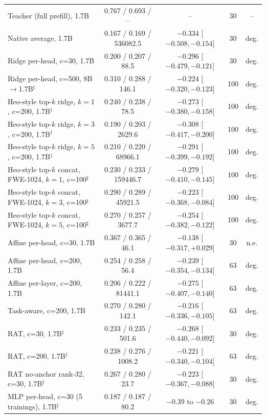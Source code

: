 \documentclass[10pt]{article}
\begin{document}
\begin{table}[t]
\begin{tabular}{lcccc}
Teacher (full prefill), 1.7B & 0.767 / 0.693 / -- & -- & 30 & -- \\
Native average, 1.7B & 0.167 / 0.169 / 536082.5 & $-0.334$ [$-0.508, -0.154$] & 30 & deg. \\
Ridge per-head, c=30, 1.7B & 0.200 / 0.207 / 88.5 & $-0.296$ [$-0.479, -0.121$] & 30 & deg. \\
Ridge per-head, c=500, 8B$\to$1.7B$^\ddagger$ & 0.310 / 0.288 / 146.1 & $-0.224$ [$-0.320, -0.123$] & 100 & deg. \\
Heo-style top-$k$ ridge, $k{=}1$, c=200, 1.7B$^\ddagger$ & 0.240 / 0.238 / 78.5 & $-0.273$ [$-0.380, -0.158$] & 100 & deg. \\
Heo-style top-$k$ ridge, $k{=}3$, c=200, 1.7B$^\ddagger$ & 0.190 / 0.203 / 2629.6 & $-0.308$ [$-0.417, -0.200$] & 100 & deg. \\
Heo-style top-$k$ ridge, $k{=}5$, c=200, 1.7B$^\ddagger$ & 0.210 / 0.220 / 68966.1 & $-0.291$ [$-0.399, -0.192$] & 100 & deg. \\
Heo-style top-$k$ concat, FWE-1024, $k{=}1$, c=100$^{\sharp}$ & 0.230 / 0.233 / 159446.7 & $-0.279$ [$-0.410, -0.145$] & 100 & deg. \\
Heo-style top-$k$ concat, FWE-1024, $k{=}3$, c=100$^{\sharp}$ & 0.290 / 0.289 / 45921.5 & $-0.223$ [$-0.368, -0.084$] & 100 & deg. \\
Heo-style top-$k$ concat, FWE-1024, $k{=}5$, c=100$^{\sharp}$ & 0.270 / 0.257 / 3677.7 & $-0.254$ [$-0.382, -0.122$] & 100 & deg. \\
Affine per-head, c=30, 1.7B & 0.367 / 0.365 / 46.1 & $-0.138$ [$-0.317, +0.029$] & 30 & n.e. \\
Affine per-head, c=200, 1.7B & 0.254 / 0.258 / 56.4 & $-0.239$ [$-0.354, -0.134$] & 63 & deg. \\
Affine per-layer, c=200, 1.7B & 0.206 / 0.222 / 81441.1 & $-0.275$ [$-0.407, -0.140$] & 63 & deg. \\
Task-aware, c=200, 1.7B & 0.270 / 0.280 / 142.1 & $-0.216$ [$-0.336, -0.105$] & 63 & deg. \\
RAT, c=30, 1.7B$^\ddagger$ & 0.233 / 0.235 / 501.6 & $-0.268$ [$-0.440, -0.092$] & 30 & deg. \\
RAT, c=200, 1.7B$^\ddagger$ & 0.238 / 0.276 / 1008.2 & $-0.221$ [$-0.340, -0.104$] & 63 & deg. \\
RAT no-anchor rank-32, c=30, 1.7B$^\ddagger$ & 0.267 / 0.280 / 23.7 & $-0.223$ [$-0.367, -0.088$] & 30 & deg. \\
MLP per-head, c=30 (5 trainings), 1.7B$^\ddagger$ & 0.187 / 0.187 / 80.2 & $-0.39$ to $-0.26$ & 30 & deg. \\

\end{tabular}
\end{table}
\end{document}
